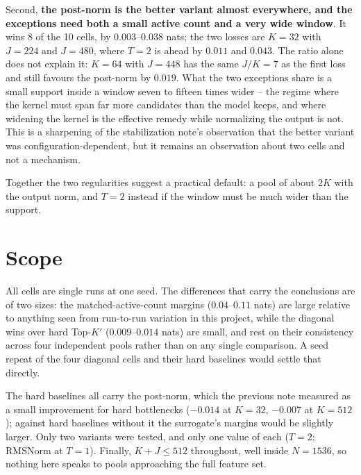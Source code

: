 \documentclass[11pt,a4paper]{article}
\newcommand{\Kp}{K'}
\begin{document}
Second, \textbf{the post-norm is the better variant almost everywhere, and
the exceptions need both a small active count and a very wide window}. It
wins 8 of the 10 cells, by $0.003$--$0.038$ nats; the two losses are $K=32$
with $J=224$ and $J=480$, where $T=2$ is ahead by $0.011$ and $0.043$. The
ratio alone does not explain it: $K=64$ with $J=448$ has the same $J/K = 7$
as the first loss and still favours the post-norm by $0.019$. What the two
exceptions share is a small support inside a window seven to fifteen times
wider -- the regime where the kernel must span far more candidates than the
model keeps, and where widening the kernel is the effective remedy while
normalizing the output is not. This is a sharpening of the stabilization
note's observation that the better variant was configuration-dependent, but
it remains an observation about two cells and not a mechanism.

Together the two regularities suggest a practical default: a pool of about
$2K$ with the output norm, and $T=2$ instead if the window must be much
wider than the support.

\section{Scope}

All cells are single runs at one seed. The differences that carry the
conclusions are of two sizes: the matched-active-count margins
($0.04$--$0.11$ nats) are large relative to anything seen from run-to-run
variation in this project, while the diagonal wins over hard Top-$\Kp$
($0.009$--$0.014$ nats) are small, and rest on their consistency across four
independent pools rather than on any single comparison. A seed repeat of the
four diagonal cells and their hard baselines would settle that directly.

The hard baselines all carry the post-norm, which the previous note measured
as a small improvement for hard bottlenecks ($-0.014$ at $K=32$, $-0.007$ at
$K=512$); against hard baselines without it the surrogate's margins would be
slightly larger. Only two variants were tested, and only one value of each
($T=2$; RMSNorm at $T=1$). Finally, $K+J \leq 512$ throughout, well inside
$N=1536$, so nothing here speaks to pools approaching the full feature set.
\end{document}
